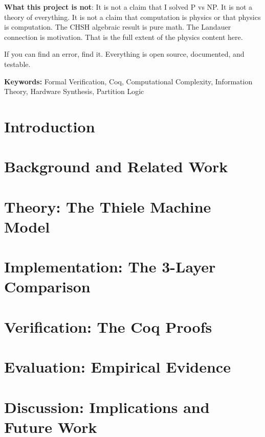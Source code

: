 \documentclass[9pt, a4paper, oneside, twocolumn]{extreport}
\theoremstyle{plain}
\theoremstyle{definition}
\theoremstyle{remark}
\begin{document}
\textbf{What this project is not}: It is not a claim that I solved P vs NP. It is not a theory of everything. It is not a claim that computation is physics or that physics is computation. The CHSH algebraic result is pure math. The Landauer connection is motivation. That is the full extent of the physics content here.

If you can find an error, find it. Everything is open source, documented, and testable.

\vspace{1cm}
\noindent\textbf{Keywords:} Formal Verification, Coq, Computational Complexity, Information Theory, Hardware Synthesis, Partition Logic

\onecolumn
\tableofcontents
\twocolumn

\chapter{Introduction}


\chapter{Background and Related Work}


\chapter{Theory: The Thiele Machine Model}


\chapter{Implementation: The 3-Layer Comparison}


\chapter{Verification: The Coq Proofs}


\chapter{Evaluation: Empirical Evidence}


\chapter{Discussion: Implications and Future Work}

\end{document}
